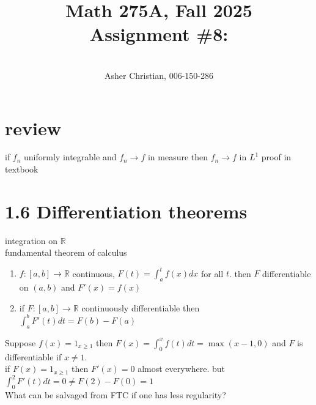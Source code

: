 \documentclass[11pt]{article}
\newcommand{\cnum}{Math 275A}
\newcommand{\ced}{Fall 2025}
\newcommand{\ctitle}[4]{\title{\vspace{-0.5in}\cnum, \ced\\Assignment #1: #2}\author{\vspace{-0.35in}\\#3, #4}}
\begin{document}
\ctitle{\#8}{}{Asher Christian}{006-150-286}
\date{}
\maketitle

\section{review}
if $f_n$ uniformly integrable and $f_n \rightarrow f$ in measure
then $f_n \rightarrow f$ in $L^{1}$ proof in textbook

\section{1.6 Differentiation theorems}
integration on $ \mathbb{R}$ 
\\
fundamental theorem of calculus
\begin{enumerate}
    \item  $f : [a,b] \rightarrow \mathbb{R}$ continuous, $F(t) = \int_{a}^{t}f(x)dx$ for all $t$.
        then $F$ differentiable on  $(a,b)$  and  $F'(x) = f(x)$ 
    \item if $F : [a,b] \rightarrow \mathbb{R}$ continuously differentiable then  $\int_{a}^{b}F'(t)dt = F(b) - F(a)$
\end{enumerate}
Suppose $f(x) = 1_{x \ge 1}$ then  $F(x) = \int_{0}^{x}f(t)dt =  \max(x-1,0)$ and
$F$ is differentiable if $x \ne 1$.\\
if  $F(x) = 1_{x \ge 1}$ then  $F'(x) = 0$ almost everywhere. but  $\int_{0}^{2}F'(t)dt = 0 \ne F(2) - F(0) = 1$\\
What can be salvaged from FTC if one has less regularity?
\end{document}
